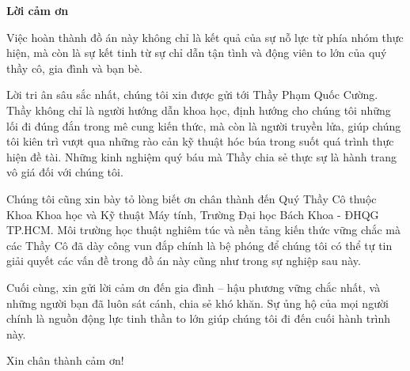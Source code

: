 \begin{center}
    \textbf{\LARGE Lời cảm ơn}
\end{center}
\vspace{2cm}
Việc hoàn thành đồ án này không chỉ là kết quả của sự nỗ lực từ phía nhóm thực hiện, mà còn là sự kết tinh từ sự chỉ dẫn tận tình và động viên to lớn của quý thầy cô, gia đình và bạn bè.

Lời tri ân sâu sắc nhất, chúng tôi xin được gửi tới Thầy Phạm Quốc Cường. Thầy không chỉ là người hướng dẫn khoa học, định hướng cho chúng tôi những lối đi đúng đắn trong mê cung kiến thức, mà còn là người truyền lửa, giúp chúng tôi kiên trì vượt qua những rào cản kỹ thuật hóc búa trong suốt quá trình thực hiện đề tài. Những kinh nghiệm quý báu mà Thầy chia sẻ thực sự là hành trang vô giá đối với chúng tôi.

Chúng tôi cũng xin bày tỏ lòng biết ơn chân thành đến Quý Thầy Cô thuộc Khoa Khoa học và Kỹ thuật Máy tính, Trường Đại học Bách Khoa - ĐHQG TP.HCM. Môi trường học thuật nghiêm túc và nền tảng kiến thức vững chắc mà các Thầy Cô đã dày công vun đắp chính là bệ phóng để chúng tôi có thể tự tin giải quyết các vấn đề trong đồ án này cũng như trong sự nghiệp sau này.

Cuối cùng, xin gửi lời cảm ơn đến gia đình – hậu phương vững chắc nhất, và những người bạn đã luôn sát cánh, chia sẻ khó khăn. Sự ủng hộ của mọi người chính là nguồn động lực tinh thần to lớn giúp chúng tôi đi đến cuối hành trình này.

Xin chân thành cảm ơn!